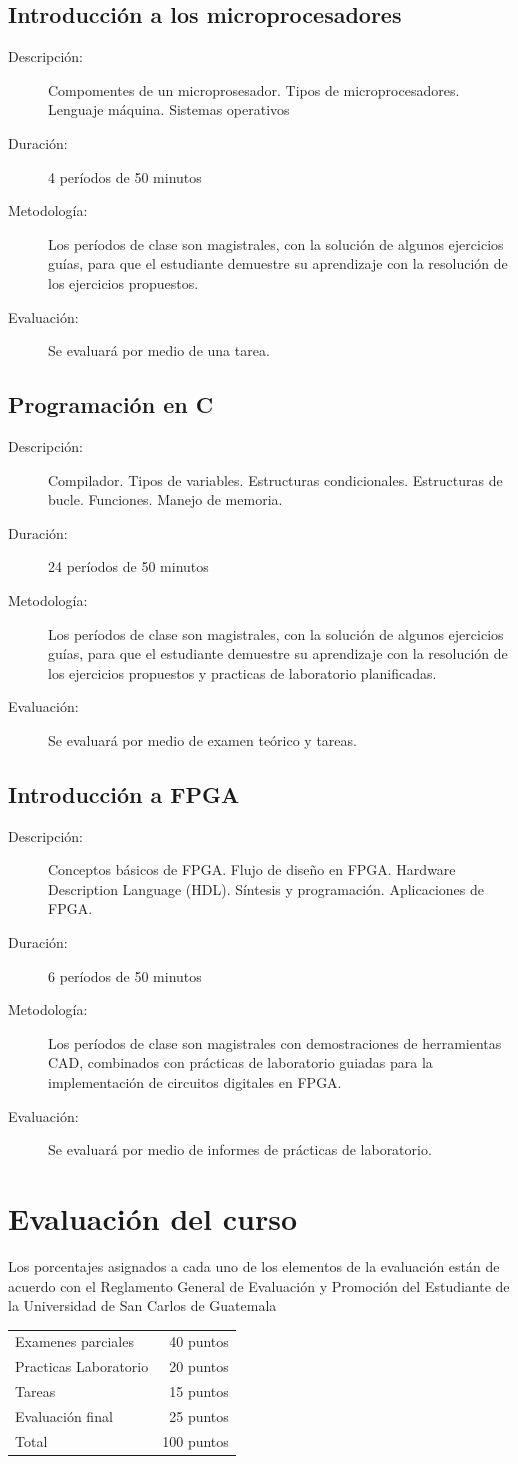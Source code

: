 \documentclass{article}
\newcommand{\unidades}[4]{%
\begin{description}
	\item[Descripción:] #1
	\item[Duración:] #2
	\item[Metodología:] #3	
	\item[Evaluación:] #4
\end{description}	
}
\begin{document}
\subsection{Introducción a los microprocesadores}
\unidades{Compomentes de un microprosesador. Tipos de microprocesadores. Lenguaje máquina. Sistemas operativos}
{4 períodos de 50 minutos}{Los períodos de clase son magistrales, con la solución de algunos ejercicios guías, para que el estudiante demuestre su aprendizaje con la resolución de los ejercicios propuestos.}{Se evaluará por medio de una tarea.}

\subsection{Programación en C}
\unidades{Compilador. Tipos de variables. Estructuras condicionales. Estructuras de bucle. Funciones. Manejo de memoria.}
{24 períodos de 50 minutos}{Los períodos de clase son magistrales, con la solución de algunos ejercicios guías, para que el estudiante demuestre su aprendizaje con la resolución de los ejercicios propuestos y practicas de laboratorio planificadas.}{Se evaluará por medio de examen teórico y tareas.}

\subsection{Introducción a FPGA}
\unidades{Conceptos básicos de FPGA. Flujo de diseño en FPGA. Hardware Description Language (HDL). Síntesis y programación. Aplicaciones de FPGA.}{6 períodos de 50 minutos}{Los períodos de clase son magistrales con demostraciones de herramientas CAD, combinados con prácticas de laboratorio guiadas para la implementación de circuitos digitales en FPGA.}{Se evaluará por medio de informes de prácticas de laboratorio.}


\section{Evaluación del curso}
Los porcentajes asignados a cada uno de los elementos de la evaluación están de acuerdo con el Reglamento General de Evaluación y Promoción del Estudiante de la Universidad de San Carlos de Guatemala 
\bigskip

\begin{tabular}{lr}
	 Examenes parciales & 40 puntos\\
	 Practicas Laboratorio & 20 puntos\\
	 Tareas & 15 puntos\\
	Evaluación final & 25 puntos\\\hline
	Total & 100 puntos\\
\end{tabular}
\end{document}
